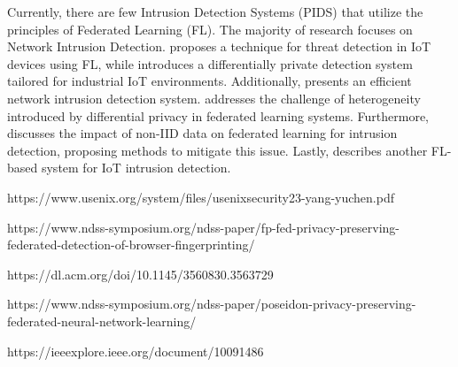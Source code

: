 Currently, there are few Intrusion Detection Systems (PIDS) that utilize the principles of Federated Learning (FL). The majority of research focuses on Network Intrusion Detection. \cite{man2021intelligent} proposes a technique for threat detection in IoT devices using FL, while \cite{friha20232df} introduces a differentially private detection system tailored for industrial IoT environments. Additionally, \cite{li2023efficient} presents an efficient network intrusion detection system. \cite{yang2023privatefl} addresses the challenge of heterogeneity introduced by differential privacy in federated learning systems. Furthermore, \cite{guo2023new} discusses the impact of non-IID data on federated learning for intrusion detection, proposing methods to mitigate this issue. Lastly, \cite{chaabene2023privacy} describes another FL-based system for IoT intrusion detection.


https://www.usenix.org/system/files/usenixsecurity23-yang-yuchen.pdf


https://www.ndss-symposium.org/ndss-paper/fp-fed-privacy-preserving-federated-detection-of-browser-fingerprinting/

https://dl.acm.org/doi/10.1145/3560830.3563729

https://www.ndss-symposium.org/ndss-paper/poseidon-privacy-preserving-federated-neural-network-learning/

https://ieeexplore.ieee.org/document/10091486
